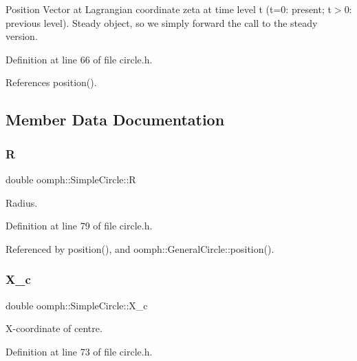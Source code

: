 Position Vector at Lagrangian coordinate zeta at time level t (t=0\+: present; t$>$0\+: previous level). Steady object, so we simply forward the call to the steady version. 



Definition at line 66 of file circle.\+h.



References position().



\subsection{Member Data Documentation}
\mbox{\label{classoomph_1_1SimpleCircle_afd2a653946537f867c0aaa12768f9514}} 
\subsubsection{\texorpdfstring{R}{R}}
{\footnotesize\ttfamily double oomph\+::\+Simple\+Circle\+::R\hspace{0.3cm}{\ttfamily [protected]}}



Radius. 



Definition at line 79 of file circle.\+h.



Referenced by position(), and oomph\+::\+General\+Circle\+::position().

\mbox{\label{classoomph_1_1SimpleCircle_abd34367dbf586e6aa73314b350a370d1}} 
\subsubsection{\texorpdfstring{X\+\_\+c}{X\_c}}
{\footnotesize\ttfamily double oomph\+::\+Simple\+Circle\+::\+X\+\_\+c\hspace{0.3cm}{\ttfamily [protected]}}



X-\/coordinate of centre. 



Definition at line 73 of file circle.\+h.



